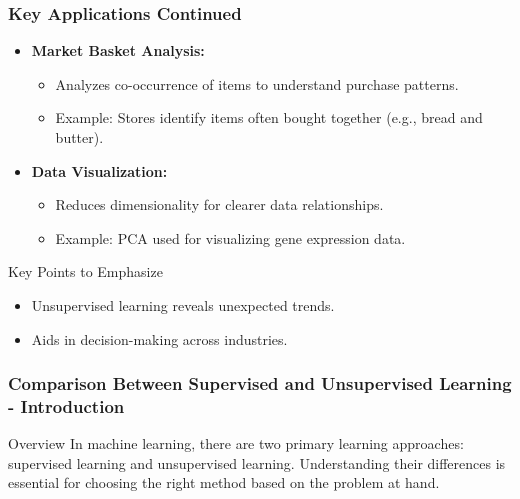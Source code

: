 \documentclass{beamer}
\begin{document}
\begin{frame}
    \frametitle{Key Applications Continued}
    \begin{itemize}
        \item \textbf{Market Basket Analysis:}
            \begin{itemize}
                \item Analyzes co-occurrence of items to understand purchase patterns.
                \item Example: Stores identify items often bought together (e.g., bread and butter).
            \end{itemize}
        \item \textbf{Data Visualization:}
            \begin{itemize}
                \item Reduces dimensionality for clearer data relationships.
                \item Example: PCA used for visualizing gene expression data.
            \end{itemize}
    \end{itemize}
    \begin{block}{Key Points to Emphasize}
        \begin{itemize}
            \item Unsupervised learning reveals unexpected trends.
            \item Aids in decision-making across industries.
        \end{itemize}
    \end{block}
\end{frame}

\begin{frame}[fragile]
    \frametitle{Comparison Between Supervised and Unsupervised Learning - Introduction}
    \begin{block}{Overview}
        In machine learning, there are two primary learning approaches: 
        supervised learning and unsupervised learning. Understanding their differences is essential for choosing the right method based on the problem at hand.
    \end{block}
\end{frame}
\end{document}
